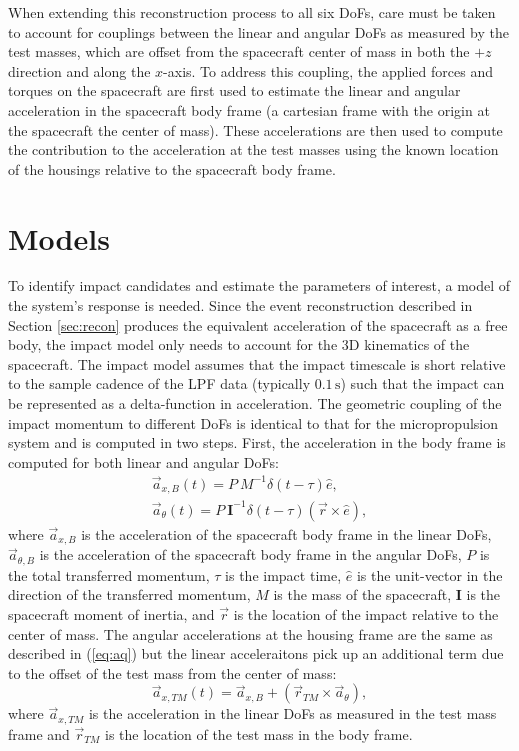 \documentclass[a4paper]{jpconf}
\begin{document}
When extending this reconstruction process to all six DoFs, care must be taken to account for couplings between the linear and angular DoFs as measured by the test masses, which are offset from the spacecraft center of mass in both the $+z$ direction and along the $x$-axis. To address this coupling, the applied forces and torques on the spacecraft are first used to estimate the linear and angular acceleration in the spacecraft body frame (a cartesian frame with the origin at the spacecraft the center of mass). These accelerations are then used to compute the contribution to the acceleration at the test masses using the known location of the housings relative to the spacecraft body frame.

\section{Models}
\label{sec:models}
To identify impact candidates and estimate the parameters of interest, a model of the system's response is needed. Since the event reconstruction described in Section \ref{sec:recon} produces the equivalent acceleration of the spacecraft as a free body, the impact model only needs to account for the 3D kinematics of the spacecraft. The impact model assumes that the impact timescale is short relative to the sample cadence of the LPF data (typically $0.1\,\textrm{s}$) such that the impact can be represented as a delta-function in acceleration. The geometric coupling of the impact momentum to different DoFs is identical to that for the micropropulsion system and is computed in two steps. First, the acceleration in the body frame is computed for both linear and angular DoFs:
\begin{eqnarray}
\vec{a}_{x,B}(t) = P\:M^{-1}\delta(t-\tau) \hat{e},\label{eq:axB} \\
\vec{a}_{\theta}(t)= P\:\mathbf{I}^{-1}\delta(t-\tau)\left(\vec{r}\times\hat{e}\right), \label{eq:aq}
\end{eqnarray}
where $\vec{a}_{x,B}$ is the acceleration of the spacecraft body frame in the linear DoFs, $\vec{a}_{\theta,B}$ is the acceleration of the spacecraft body frame in the angular DoFs, $P$ is the total transferred momentum, $\tau$ is the impact time, $\hat{e}$ is the unit-vector in the direction of the transferred momentum, $M$ is the mass of the spacecraft, $\mathbf{I}$ is the spacecraft moment of inertia, and $\vec{r}$ is the location of the impact relative to the center of mass. The angular accelerations at the housing frame are the same as described in (\ref{eq:aq}) but the linear acceleraitons pick up an additional term due to the offset of the test mass from the center of mass:
\begin{equation}
\vec{a}_{x,TM}(t) = \vec{a}_{x,B} + \left(\vec{r}_{TM}\times \vec{a}_{\theta}\right),\label{eq:axTM}
\end{equation}
where $\vec{a}_{x,TM}$ is the acceleration in the linear DoFs as measured in the test mass frame and $\vec{r}_{TM}$ is the location of the test mass in the body frame.
\end{document}
